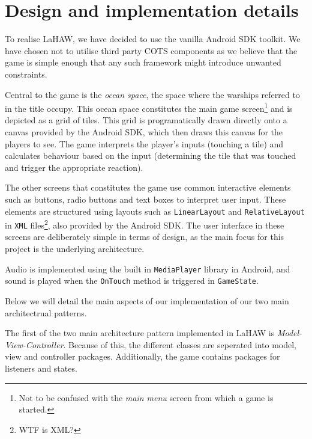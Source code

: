 




\chapter{Design and implementation details}
\label{cha:design_details}

To realise LaHAW, we have decided to use the vanilla Android SDK toolkit. We have chosen not to utilise third party COTS components as we believe that the game is simple enough that any such framework might introduce unwanted constraints.

Central to the game is the \emph{ocean space}, the space where the warships referred to in the title occupy. This ocean space constitutes the main game screen\footnote{Not to be confused with the \emph{main menu} screen from which a game is started.} and is depicted as a grid of tiles.
This grid is programatically drawn directly onto a canvas provided by the Android SDK, which then draws this canvas for the players to see. The game interprets the player's inputs (touching a tile) and calculates behaviour based on the input (determining the tile that was touched and trigger the appropriate reaction).

The other screens that constitutes the game use common interactive elements such as buttons, radio buttons and text boxes to interpret user input. These elements are structured using layouts such as \texttt{LinearLayout} and \texttt{RelativeLayout} in \texttt{XML} files\footnote{WTF is XML?}, also provided by the Android SDK. The user interface in these screens are deliberately simple in terms of design, as the main focus for this project is the underlying architecture.

Audio is implemented using the built in \texttt{MediaPlayer} library in Android, and sound is played when the \texttt{OnTouch} method is triggered in \texttt{GameState}.


Below we will detail the main aspects of our implementation of our two main architectrual patterns.

The first of the two main architecture pattern implemented in LaHAW is \emph{Model-View-Controller}. Because of this, the different classes are seperated into model, view and controller packages. Additionally, the game contains packages for listeners and states.

